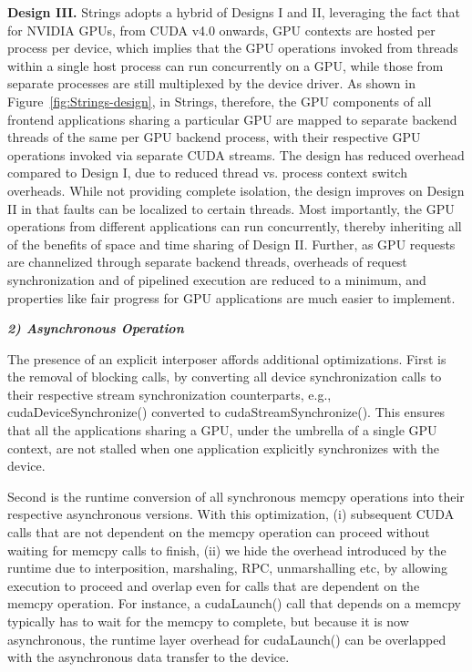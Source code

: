 \textbf{Design III.} 
Strings adopts a hybrid of Designs I and II, leveraging the fact that for NVIDIA GPUs, from CUDA v4.0 onwards, GPU contexts are hosted per process per device, which implies that the GPU operations invoked from threads within a single host process can run concurrently on a GPU, while those from separate processes are still multiplexed by the device driver. As shown in Figure~\ref{fig:Strings-design}, in Strings, therefore, the GPU components of all frontend applications sharing a particular GPU are mapped to separate backend threads of the same per GPU backend process, with their respective GPU operations invoked via separate CUDA streams. The design has reduced overhead compared to Design I, due to reduced thread vs. process context switch overheads. While not providing complete isolation, the design improves on Design II in that faults can be localized to certain threads. Most importantly, the GPU operations from different applications can run concurrently, thereby inheriting all of the benefits of space and time sharing of Design II. Further, as GPU requests are channelized through separate backend threads, overheads of request synchronization and of pipelined execution are reduced to a minimum, and properties like fair progress for GPU applications are much easier to implement.

\textbf{\textit{2) Asynchronous Operation}}

The presence of an explicit interposer affords additional optimizations. First is the removal of blocking calls, by converting all device synchronization calls to their respective stream synchronization counterparts, e.g., cudaDeviceSynchronize() converted to cudaStreamSynchronize(). This ensures that all the applications sharing a GPU, under the umbrella of a single GPU context, are not stalled when one application explicitly synchronizes with the device.

Second is the runtime conversion of all synchronous memcpy operations into their respective asynchronous versions. With this optimization, (i) subsequent CUDA calls that are not dependent on the memcpy operation can proceed without waiting for memcpy calls to finish, (ii) we hide the overhead introduced by the runtime due to interposition, marshaling, RPC, unmarshalling etc, by allowing execution to proceed and overlap even for calls that are dependent on the memcpy operation. For instance, a cudaLaunch() call that depends on a memcpy typically has to wait for the memcpy to complete, but because it is now asynchronous, the runtime layer overhead for cudaLaunch() can be overlapped with the asynchronous data transfer to the device.

